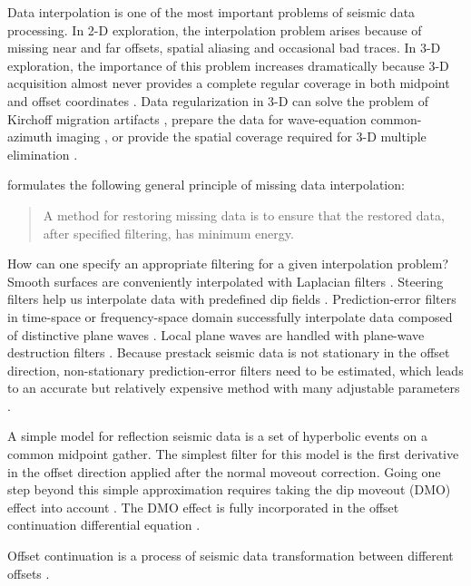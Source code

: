 Data interpolation is one of the most important problems of seismic
data processing. In 2-D exploration, the interpolation problem arises
because of missing near and far offsets, spatial aliasing and
occasional bad traces. In 3-D exploration, the importance of this
problem increases dramatically because 3-D acquisition almost never
provides a complete regular coverage in both midpoint and offset
coordinates \cite[]{Biondi.3dsi.99}. Data regularization in 3-D can
solve the problem of Kirchoff migration artifacts \cite[]{SEG-1994-1553},
prepare the data for wave-equation common-azimuth imaging
\cite[]{GEO61-06-18221832}, or provide the spatial coverage required for 3-D
multiple elimination \cite[]{SEG-1998-1321}.
\par
\cite{Claerbout.blackwell.92,gee} formulates the following general
principle of missing data interpolation:
\begin{quote}
  A method for restoring missing data is to ensure that the restored
  data, after specified filtering, has minimum energy.
\end{quote}
How can one specify an appropriate filtering for a given interpolation
problem? Smooth surfaces are conveniently interpolated with Laplacian
filters \cite[]{GEO39-01-00390048}. Steering filters help us
interpolate data with predefined dip fields \cite[]{SEG-1998-1851}.
Prediction-error filters in time-space or frequency-space domain
successfully interpolate data composed of distinctive plane waves
\cite[]{GEO56-06-07850794,gee}. Local plane waves are handled with
plane-wave destruction filters \cite[]{GEO67-06-19461960}.  Because
prestack seismic data is not stationary in the offset direction,
non-stationary prediction-error filters need to be estimated, which
leads to an accurate but relatively expensive method with many
adjustable parameters \cite[]{SEG-1999-11541157}.  \par A simple model
for reflection seismic data is a set of hyperbolic events on a common
midpoint gather. The simplest filter for this model is the first
derivative in the offset direction applied after the normal moveout
correction. Going one step beyond this simple approximation requires
taking the dip moveout (DMO) effect into account
\cite[]{FBR04-07-00070024}. The DMO effect is fully incorporated in
the offset continuation differential equation
\cite[]{me,GEO68-02-07180732}.  \par Offset continuation is a process
of seismic data transformation between different offsets
\cite[]{GPR29-03-03740406,GPR30-06-08130828,GPR30-06-08290849}.
